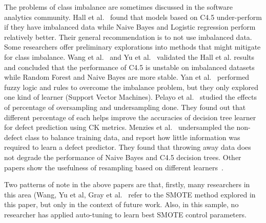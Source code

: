 \documentclass[10pt,conference]{IEEEtran}
\theoremstyle{break}
\theoremstyle{break}
\newcommand{\sma}{{\sc SMOTE}}
\begin{document}
The problems of class imbalance are sometimes discussed in the software analytics community.
Hall et al.~\cite{hall2012systematic} found that models based on C4.5 under-perform if they have imbalanced data while Naive Bayes and Logistic regression perform relatively better. 
Their general recommendation is to not use
imbalanced data.  
Some researchers offer preliminary explorations into methods that might mitigate for class imbalance.
Wang et al.~\cite{wang2013using} and Yu et al.~\cite{yuperformance} validated the Hall et al. results and concluded that the
performance of C4.5 is unstable on imbalanced datasets while  Random Forest and Naive Bayes are 
more stable. 
Yan et al.~\cite{yan2010software} performed fuzzy logic and rules to overcome the imbalance problem, but they only
explored one kind of learner (Support Vector Machines).
Pelayo et al.~\cite{pelayo2007applying} studied the effects of percentage of oversampling and undersampling done. They found out that different percentage of each helps improve the accuracies of decision tree learner for defect prediction using CK metrics. Menzies et al.~\cite{menzies2008implications} undersampled the non-defect class to balance training
data, and report how little information was required to learn a defect predictor. They found that throwing away data does not degrade the performance of Naive Bayes and C4.5 decision trees. Other papers show the usefulness of resampling based on different learners~\cite{pelayo2007applying, pelayo2012evaluating, riquelme2008finding}.

Two patterns of note in the above papers are that, firstly, 
many researchers in this area  (Wang, Yu et al,  Gray et al.~\cite{gray2009using,yuperformance,wang2013using} refer to the {\sma} method explored in this paper,  but only in the context of future work. 
Also, 
in this sample, no researcher has  applied auto-tuning to learn best {\sma} control parameters. 
\end{document}
